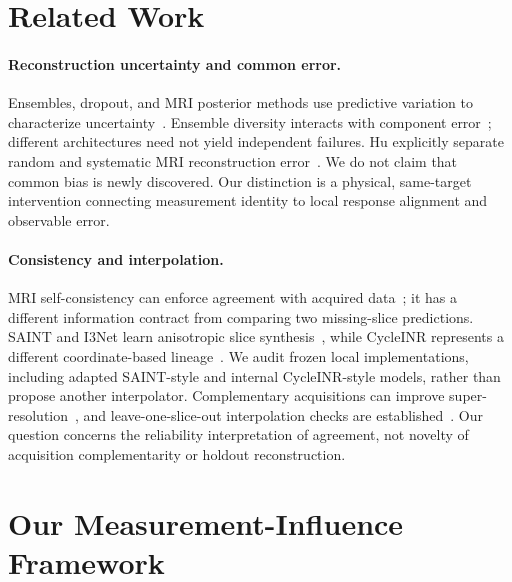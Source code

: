 \documentclass[10pt,twocolumn,letterpaper]{article}
\begin{document}
\section{Related Work}
\paragraph{Reconstruction uncertainty and common error.}
Ensembles, dropout, and MRI posterior methods use predictive variation to characterize uncertainty~\cite{lakshminarayanan2017ensembles,gal2016dropout,edupuganti2021uncertainty,narnhofer2022bayesian,luo2023diffusion}. Ensemble diversity interacts with component error~\cite{brown2005diversity,ortega2022diversity}; different architectures need not yield independent failures. Hu \etal explicitly separate random and systematic MRI reconstruction error~\cite{hu2021predict}. We do not claim that common bias is newly discovered. Our distinction is a physical, same-target intervention connecting measurement identity to local response alignment and observable error.

\paragraph{Consistency and interpolation.}
MRI self-consistency can enforce agreement with acquired data~\cite{lustig2010spirit}; it has a different information contract from comparing two missing-slice predictions. SAINT and I3Net learn anisotropic slice synthesis~\cite{peng2020saint,song2024i3net}, while CycleINR represents a different coordinate-based lineage~\cite{fang2024cycleinr}. We audit frozen local implementations, including adapted SAINT-style and internal CycleINR-style models, rather than propose another interpolator. Complementary acquisitions can improve super-resolution~\cite{greenspan2002interslice,nicastro2022shift}, and leave-one-slice-out interpolation checks are established~\cite{horvath2017highorder}. Our question concerns the reliability interpretation of agreement, not novelty of acquisition complementarity or holdout reconstruction.

\section{Our Measurement-Influence Framework}
\end{document}

